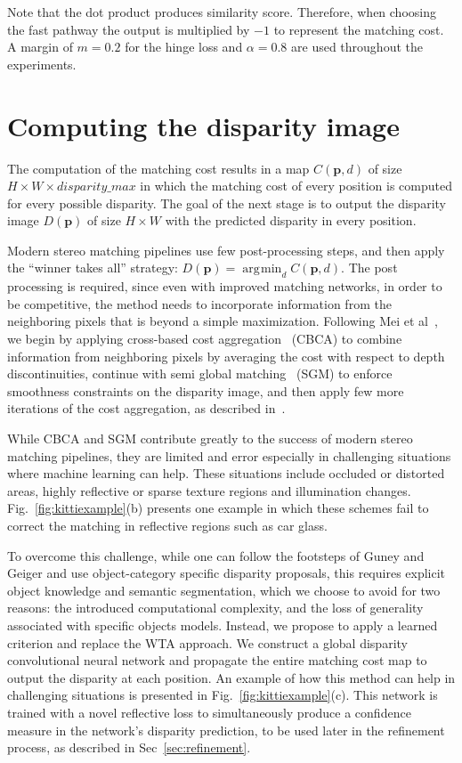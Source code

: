 \documentclass[10pt, twocolumn, letterpaper]{article}
\DeclareMathOperator*{\argmin}{arg\!\min}
\begin{document}
Note that the dot product produces similarity score. Therefore, when choosing the fast pathway the output is multiplied by $-1$ to represent the matching cost. A margin of $m=0.2$ for the hinge loss and $\alpha = 0.8$ are used throughout the experiments.

\section{Computing the disparity image}
\label{sec:disparity}

The computation of the matching cost results in a map $C(\mathbf{p}, d)$ of size $H\times W\times disparity\_max$ in which the matching cost of every position is computed for every possible disparity. The goal of the next stage is to output the disparity image $D(\mathbf{p})$ of size $H\times W$ with the predicted disparity in every position.

Modern stereo matching pipelines use few post-processing steps, and then apply the ``winner takes all'' strategy: 
$D(\mathbf{p}) = \argmin_d C(\mathbf{p}, d)$. The post processing is required, since even with improved matching networks, in order to be competitive, the method needs to incorporate information from the neighboring pixels that is beyond a simple maximization. Following Mei et al~\cite{mei}, we begin by applying cross-based cost aggregation~\cite{cbca} (CBCA) to combine information from neighboring pixels by averaging the cost with respect to depth discontinuities, continue with semi global matching~\cite{hirschmuller} (SGM) to enforce smoothness constraints on the disparity image, and then apply few more iterations of the cost aggregation, as described in~\cite{newlecun}.

While CBCA and SGM contribute greatly to the success of modern stereo matching pipelines, they are limited and error especially in challenging situations where machine learning can help. These situations include occluded or distorted areas, highly reflective or sparse texture regions and illumination changes. 
Fig.~\ref{fig:kittiexample}(b) presents one example in which these schemes fail to correct the matching in reflective regions such as car glass. 

To overcome this challenge, while one can follow the footsteps of Guney and Geiger\cite{displets} 
and use object-category specific disparity proposals, this requires explicit object knowledge and semantic segmentation, which we choose to avoid for two reasons: the introduced computational complexity, and the loss of generality associated with specific objects models. Instead, we propose to apply a learned criterion and replace the WTA approach. We construct a global disparity convolutional neural network and propagate the entire matching cost map to output the disparity at each position. An example of how this method can help in challenging situations is presented in Fig.~\ref{fig:kittiexample}(c). This network is trained with a novel reflective loss to simultaneously produce a confidence measure in the network's disparity prediction, to be used later in the refinement process, as described in Sec~\ref{sec:refinement}.
\end{document}
